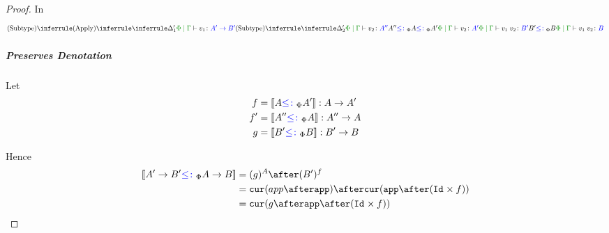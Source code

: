 \documentclass{report}
\begin{document}
\begin{framed}
\begin{proof}
                    In
                    \begin{equation}
                        \scalebox{.9}{$
                        \ntreeruleII{\vsubtype}{
                            \ntreeruleII{\vapply}{
                                \treeruleI{
                                    \D'_1
                                }{
                                    \gpetyperelation{v_1}{\fntype{A'}{B'}}
                                }
                            }{
                                \ntreeruleII{\vsubtype}{
                                    \treeruleI{\D'_2}{\gpetyperelation{v_2}{A''}}
                                    }{
                                    A'' \subtypep A \subtypep A'
                                } {
                                    \gpetyperelation{v_2}{A'}
                                }
                            }{
                                \gpetyperelation{\apply{v_1}{v_2}}{B'}
                            }
                            }{
                            B' \subtypep B
                        }{
                            \gpetyperelation{\apply{v_1}{v_2}}{B}
                        }
                        $}
                    \end{equation}

                    \subparagraph{Preserves Denotation}
                        Let
                        \begin{align*}
                            f & = {\bf [\![}A{\color{blue} \leq\colon}_\Phi A'{\bf ]\!]}: A\rightarrow A' \\
                            f' & = {\bf [\![}A''{\color{blue} \leq\colon}_\Phi A{\bf ]\!]}: A'' \rightarrow A \\
                            g & = {\bf [\![}B' {\color{blue} \leq\colon}_\Phi B{\bf ]\!]}: B' \rightarrow B \\
                        \end{align*}
        
                        Hence 
                        \begin{align*}
                            \deno{\fntype{A'}{B'}\subtypep \ab} & = (g)^A \after (B')^f \\
                            & = \cur{app\after \app}\after\cur{\app\after(\Id{}\times f)}\\
                            & = \cur {g\after\app\after(\Id{}\times f)}
                        \end{align*}
        

\end{proof}
\end{framed}
\end{document}
